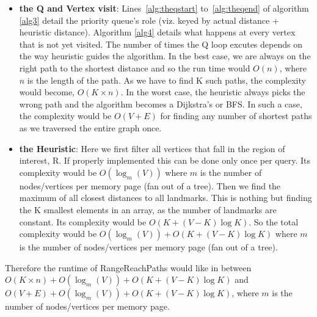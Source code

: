 \begin{itemize}
	\item \textbf{the Q and Vertex visit}: Lines~\ref{alg:theqstart} to~\ref{alg:theqend} of algorithm \ref{alg3} detail the priority queue's role (viz. keyed by actual distance + heuristic distance). Algorithm \ref{alg4} details what happens at every vertex that is not yet visited. The number of times the Q loop excutes depends on the way heuristic guides the algorithm. In the best case, we are always on the right path to the shortest distance and so the run time would $O(n)$, where $n$ is the length of the path. As we have to find K such paths, the complexity would become, $O(K \times n)$. In the worst case, the heuristic always picks the wrong path and the algorithm becomes a Dijkstra's or BFS. In such a case, the complexity would be $O(V + E)$ for finding any number of shortest paths as we traversed the entire graph once. 

	\item \textbf{the Heuristic}: Here we first filter all vertices that fall in the region of interest, R. If properly implemented this can be done only once per query. Its complexity would be $O(\log_m (V))$ where $m$ is the number of nodes/vertices per memory page (fan out of a tree). Then we find the maximum of all closest distances to all landmarks. This is nothing but finding the K smallest elements in an array, as the number of landmarks are constant. Its complexity would be $O(K + (V-K)\log K)$. So the total complexity would be $O(\log_m (V)) + O(K + (V-K)\log K)$ where $m$ is the number of nodes/vertices per memory page (fan out of a tree).
\end{itemize}

Therefore the runtime of RangeReachPaths would like in between $O(K \times n) + O(\log_m (V)) + O(K + (V-K)\log K)$ and $O(V + E) + O(\log_m (V)) + O(K + (V-K)\log K)$, where $m$ is the number of nodes/vertices per memory page.